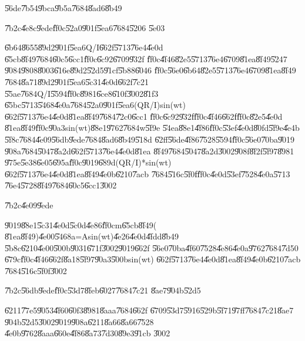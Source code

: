 \documentclass{article}
\begin{document}
\U{56de}\U{7b54}\U{9bca}\U{9b5a}\U{7684}\U{8ad6}\U{8b49}

\U{7b2c}\U{4e8c}\U{9ede}\U{ff0c}\U{52a0}\U{901f}\U{5ea6}\U{7684}\U{5206}%
\U{5e03}

\U{6b64}\U{8655}\U{89d2}\U{901f}\U{5ea6}Q/I\U{662f}\U{5713}\U{76e4}\U{4e0d}%
\U{65cb}\U{8f49}\U{7684}\U{60c5}\U{6cc1}\U{ff0c}\U{6c92}\U{6709}\U{932f}%
\U{ff0c}\U{4f46}\U{82e5}\U{5713}\U{76e4}\U{6709}\U{81ea}\U{8f49}\U{5247}%
\U{9084}\U{9808}\U{8003}\U{616e}\U{89d2}\U{52d5}\U{91cf}\U{5b88}\U{6046}%
\U{ff0c}\U{56e0}\U{6b64}\U{82e5}\U{5713}\U{76e4}\U{6709}\U{81ea}\U{8f49}%
\U{7684}\U{8a71}\U{89d2}\U{901f}\U{5ea6}\U{5c31}\U{4e0d}\U{662f}\U{7c21}%
\U{55ae}\U{7684}Q/I\U{5594}\U{ff0c}\U{8981}\U{6ce8}\U{610f}\U{3002}\U{81f3}%
\U{65bc}\U{5713}\U{5468}\U{4e0a}\U{7684}\U{52a0}\U{901f}\U{5ea6}(QR/I)sin(wt)%
\U{662f}\U{5713}\U{76e4}\U{4e0d}\U{81ea}\U{8f49}\U{7684}\U{72c0}\U{6cc1}%
\U{ff0c}\U{6c92}\U{932f}\U{ff0c}\U{4f46}\U{662f}\U{ff0c}\U{82e5}\U{4e0d}%
\U{81ea}\U{8f49}\U{ff0c}\U{90a3}sin(wt)\U{88e1}\U{9762}\U{7684}w\U{5f9e}%
\U{54ea}\U{88e1}\U{4f86}\U{ff0c}\U{53ef}\U{4e0d}\U{80fd}\U{5f9e}\U{4e4b}%
\U{5f8c}\U{7684}\U{4e09}\U{56db}\U{9ede}\U{7684}\U{8ad6}\U{8b49}\U{518d}%
\U{62ff}\U{56de}\U{4f86}\U{7528}\U{5594}\U{ff0c}\U{56e0}\U{70ba}\U{9019}%
\U{908a}\U{7684}\U{5047}\U{8a2d}\U{662f}\U{5713}\U{76e4}\U{4e0d}\U{81ea}%
\U{8f49}\U{7684}\U{5047}\U{8a2d}\U{3002}\U{908f}\U{8f2f}\U{5f97}\U{8981}%
\U{975e}\U{5e38}\U{6e05}\U{695a}\U{ff0c}\U{9019}\U{689d}(QR/I)*sin(wt)%
\U{662f}\U{5713}\U{76e4}\U{4e0d}\U{81ea}\U{8f49}\U{4e0b}\U{6210}\U{7acb}%
\U{7684}\U{516c}\U{5f0f}\U{ff0c}\U{4e0d}\U{53ef}\U{7528}\U{4e0a}\U{5713}%
\U{76e4}\U{5728}\U{8f49}\U{7684}\U{60c5}\U{6cc1}\U{3002}

\U{7b2c}\U{4e09}\U{9ede}

\U{9019}\U{88e1}\U{5c31}\U{4e0d}\U{5c0d}\U{4e86}\U{ff0c}m\U{65cb}\U{8f49}(%
\U{81ea}\U{8f49})\U{4e00}\U{5468}a=Asin(wt)\U{4e26}\U{4e0d}\U{4fdd}\U{8b49}%
\U{5b8c}\U{6210}\U{4e00}\U{500b}\U{9031}\U{671f}\U{3002}\U{9019}\U{662f}%
\U{56e0}\U{70ba}\U{4f60}\U{7528}\U{4e86}\U{4e0a}\U{9762}\U{7684}\U{7d50}%
\U{679c}\U{ff0c}\U{4f46}\U{662f}\U{8a18}\U{5f97}\U{90a3}\U{500b}sin(wt)%
\U{662f}\U{5713}\U{76e4}\U{4e0d}\U{81ea}\U{8f49}\U{4e0b}\U{6210}\U{7acb}%
\U{7684}\U{516c}\U{5f0f}\U{3002}

\U{7b2c}\U{56db}\U{9ede}\U{ff0c}\U{53d7}\U{8feb}\U{6027}\U{7684}\U{7c21}%
\U{8ae7}\U{904b}\U{52d5}

\U{6211}\U{77e5}\U{9053}\U{4f60}\U{60f3}\U{8981}\U{8aaa}\U{7684}\U{662f}%
\U{6709}\U{53d7}\U{5916}\U{529b}\U{5f71}\U{97ff}\U{7684}\U{7c21}\U{8ae7}%
\U{904b}\U{52d5}\U{3002}\U{9019}\U{908a}\U{6211}\U{8a66}\U{8a66}\U{7528}%
\U{4e0b}\U{9762}\U{8aaa}\U{660e}\U{4f86}\U{8a73}\U{7d30}\U{89e3}\U{91cb}%
\U{3002}
\end{document}
